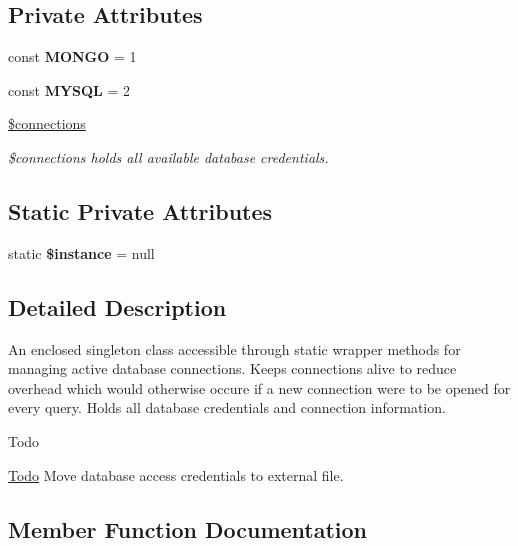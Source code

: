 \subsection*{Private Attributes}
\begin{DoxyCompactItemize}
\item 
\mbox{\label{class_d_b_connection_a33aae4c65470265fd7be44a7605d379c}} 
const {\bfseries M\+O\+N\+GO} = 1
\item 
\mbox{\label{class_d_b_connection_ad5069a952f7f551b99564867ff5a24a9}} 
const {\bfseries M\+Y\+S\+QL} = 2
\item 
\hyperlink{class_d_b_connection_a8d01870fbfcf9232c0e94c50a7142331}{\$connections}
\begin{DoxyCompactList}\small\item\em \$connections holds all available database credentials. \end{DoxyCompactList}\end{DoxyCompactItemize}
\subsection*{Static Private Attributes}
\begin{DoxyCompactItemize}
\item 
\mbox{\label{class_d_b_connection_ad9d7ce33ebb142b70e58b68052ca0ea8}} 
static {\bfseries \$instance} = null
\end{DoxyCompactItemize}


\subsection{Detailed Description}
An enclosed singleton class accessible through static wrapper methods for managing active database connections. Keeps connections alive to reduce overhead which would otherwise occure if a new connection were to be opened for every query. Holds all database credentials and connection information. \begin{DoxyRefDesc}{Todo}
\item[\hyperlink{todo__todo000002}{Todo}]Move database access credentials to external file. \end{DoxyRefDesc}


\subsection{Member Function Documentation}
\mbox{\label{class_d_b_connection_a1191ef26fe6381a3bfbd33c0c6f7b9f4}} 
